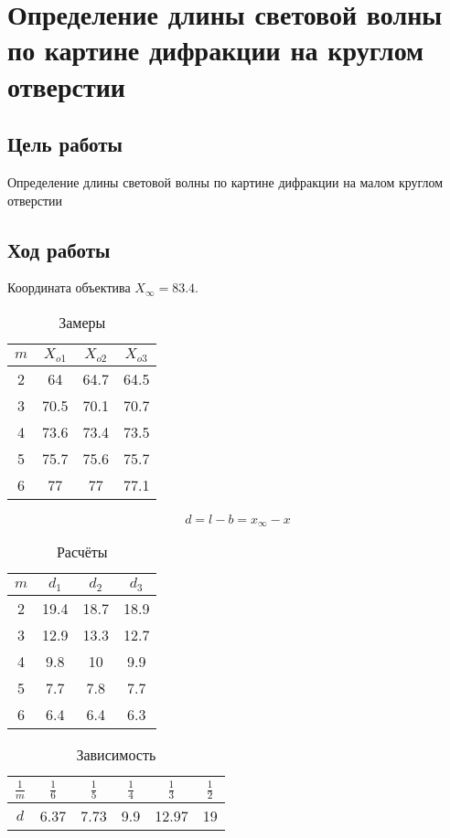 \chapter{Определение длины световой волны по картине дифракции на круглом отверстии}

\section{Цель работы}

Определение длины световой волны по картине дифракции на малом круглом отверстии

\section{Ход работы}

Координата объектива $X_\infty = 83.4$.

\begin{table}[H]
	\centering
	\caption{Замеры}
	\begin{tabular}{|c|c|c|c|}
		\hline
		$m$ & $X_{o1}$ & $X_{o2}$ & $X_{o3}$ \\ \hline
		2 & 64 & 64.7 & 64.5 \\ \hline
		3 & 70.5 & 70.1 & 70.7 \\ \hline
		4 & 73.6 & 73.4 & 73.5 \\ \hline
		5 & 75.7 & 75.6 & 75.7 \\ \hline
		6 & 77 & 77 & 77.1 \\ \hline
	\end{tabular}
\end{table}

\[
d=l-b=x_\infty-x
\]
\begin{table}[H]
	\centering
	\caption{Расчёты}
	\begin{tabular}{|c|c|c|c|}
		\hline
		$m$ & $d_1$ & $d_2$ & $d_3$ \\ \hline
		2 & 19.4 & 18.7 & 18.9 \\ \hline
		3 & 12.9 & 13.3 & 12.7 \\ \hline
		4 & 9.8 & 10 & 9.9 \\ \hline
		5 & 7.7 & 7.8 & 7.7 \\ \hline
		6 & 6.4 & 6.4 & 6.3 \\ \hline
	\end{tabular}
\end{table}

\begin{table}[H]
	\centering
	\caption{Зависимость}
	\begin{tabular}{|c|c|c|c|c|c|}
		\hline
		$\frac{1}{m}$ & $\frac{1}{6}$ & $\frac{1}{5}$ & $\frac{1}{4}$ & $\frac{1}{3}$ & $\frac{1}{2}$ \\ \hline
		$d$ & 6.37 & 7.73 & 9.9 & 12.97 & 19 \\ \hline
	\end{tabular}
\end{table}

